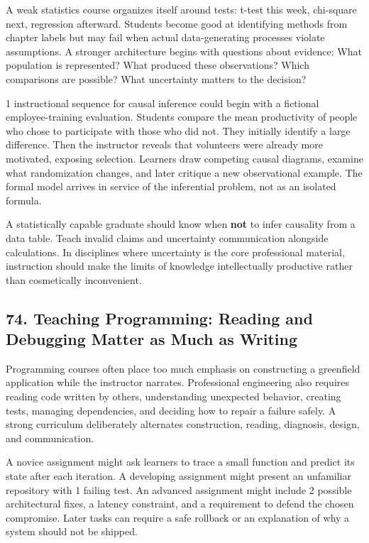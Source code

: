 A weak statistics course organizes itself around tests: t-test this week, chi-square next, regression afterward. Students become good at identifying methods from chapter labels but may fail when actual data-generating processes violate assumptions. A stronger architecture begins with questions about evidence: What population is represented? What produced these observations? Which comparisons are possible? What uncertainty matters to the decision?

1 instructional sequence for causal inference could begin with a fictional employee-training evaluation. Students compare the mean productivity of people who chose to participate with those who did not. They initially identify a large difference. Then the instructor reveals that volunteers were already more motivated, exposing selection. Learners draw competing causal diagrams, examine what randomization changes, and later critique a new observational example. The formal model arrives in service of the inferential problem, not as an isolated formula.

A statistically capable graduate should know when \textbf{not} to infer causality from a data table. Teach invalid claims and uncertainty communication alongside calculations. In disciplines where uncertainty is the core professional material, instruction should make the limits of knowledge intellectually productive rather than cosmetically inconvenient.

\subsection*{74. Teaching Programming: Reading and Debugging Matter as Much as Writing}

Programming courses often place too much emphasis on constructing a greenfield application while the instructor narrates. Professional engineering also requires reading code written by others, understanding unexpected behavior, creating tests, managing dependencies, and deciding how to repair a failure safely. A strong curriculum deliberately alternates construction, reading, diagnosis, design, and communication.

A novice assignment might ask learners to trace a small function and predict its state after each iteration. A developing assignment might present an unfamiliar repository with 1 failing test. An advanced assignment might include 2 possible architectural fixes, a latency constraint, and a requirement to defend the chosen compromise. Later tasks can require a safe rollback or an explanation of why a system should not be shipped.

